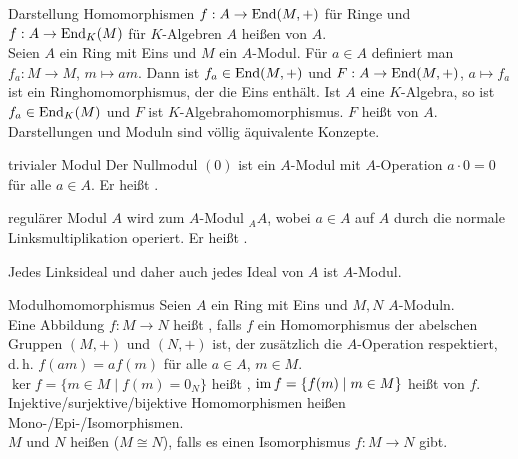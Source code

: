 \begin{Def}{Darstellung}
    Homomorphismen $f: A \rightarrow \operatorname{End}(M,+)$ für Ringe
    und $f: A \rightarrow \operatorname{End}_K(M)$ für $K$-Algebren $A$ heißen
     von $A$. \\
    Seien $A$ ein Ring mit Eins und $M$ ein $A$-Modul.
    Für $a \in A$ definiert man $f_a: M \rightarrow M$, $m \mapsto am$.
    Dann ist $f_a \in \operatorname{End}(M,+)$ und $F: A \rightarrow \operatorname{End}(M,+)$,
    $a \mapsto f_a$ ist ein Ringhomomorphismus, der die Eins enthält.
    Ist $A$ eine $K$-Algebra, so ist $f_a \in \operatorname{End}_K(M)$ und $F$ ist
    $K$-Algebrahomomorphismus.
    $F$ heißt  von $A$. \\
    Darstellungen und Moduln sind völlig äquivalente Konzepte.
\end{Def}

\begin{Def}{trivialer Modul}
    Der Nullmodul $(0)$ ist ein $A$-Modul mit $A$-Operation
    $a \cdot 0 = 0$ für alle $a \in A$.
    Er heißt .
\end{Def}

\begin{Def}{regulärer Modul}
    $A$ wird zum $A$-Modul ${}_A A$, wobei $a \in A$ auf $A$ durch
    die normale Linksmultiplikation operiert.
    Er heißt .
\end{Def}

\begin{Kor}
    Jedes Linksideal und daher auch jedes Ideal von $A$ ist $A$-Modul.
\end{Kor}

\begin{Def}{Modulhomomorphismus}
    Seien $A$ ein Ring mit Eins und $M, N$ $A$-Moduln. \\
    Eine Abbildung $f: M \rightarrow N$ heißt
    , falls $f$ ein
    Homomorphismus der abelschen Gruppen $(M,+)$ und $(N,+)$ ist,
    der zusätzlich die $A$-Operation respektiert, d.\,h.
    $f(am) = af(m)$ für alle $a \in A$, $m \in M$. \\
    $\ker f = \{m \in M \;|\; f(m) = 0_N\}$ heißt ,
    $\operatorname{im} f = \{f(m) \;|\; m \in M\}$ heißt  von $f$. \\
    Injektive/surjektive/bijektive Homomorphismen heißen
    Mono-/Epi-/Isomorphismen. \\
    $M$ und $N$ heißen 
    ($M \cong N$), falls es einen Isomorphismus $f: M \rightarrow N$ gibt.
\end{Def}

